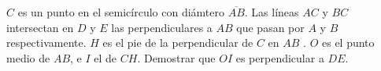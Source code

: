\begin{problem}
	$C$  es un punto en el semicírculo con diámtero $\overline{AB}$. Las líneas $AC$ y $BC$ intersectan en $D$ y $E$ las perpendiculares a $AB$ que pasan por $A$ y $B$ respectivamente. $H$ es el pie de la perpendicular de $C$ en $AB$ . $O$ es el punto medio de $AB$, e $I$ el de $CH$. Demostrar que $OI$ es perpendicular a $DE$.
\end{problem}